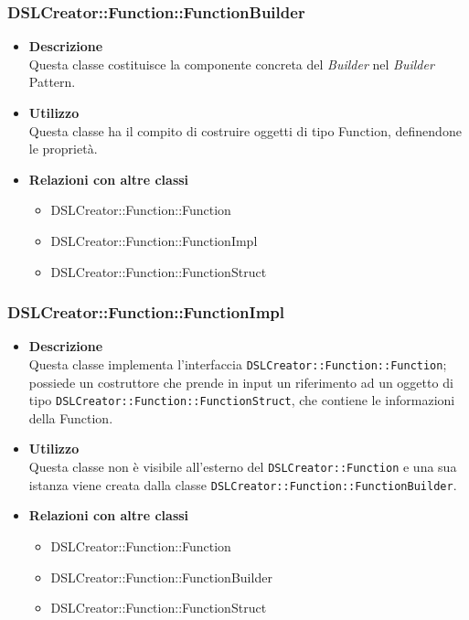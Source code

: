  \subsubsection{DSLCreator::Function::FunctionBuilder}
                    \begin{itemize}
                        \item \textbf{Descrizione} \hfill \\
                          Questa classe costituisce la componente concreta del \textit{Builder} nel \textit{Builder} Pattern.
                        \item \textbf{Utilizzo} \hfill \\
                          Questa classe ha il compito di costruire oggetti di tipo Function, definendone le proprietà.
                        \item \textbf{Relazioni con altre classi}
                            \begin{itemize}
                              \item DSLCreator::Function::Function
                              \item DSLCreator::Function::FunctionImpl
                              \item DSLCreator::Function::FunctionStruct
                            \end{itemize}
                    \end{itemize}  

 \subsubsection{DSLCreator::Function::FunctionImpl}
                    \begin{itemize}
                        \item \textbf{Descrizione} \hfill \\
                          Questa classe implementa l'interfaccia \texttt{DSLCreator::Function::Function}; possiede un costruttore che prende in input un riferimento ad un oggetto di tipo \texttt{DSLCreator::Function::FunctionStruct}, che contiene le informazioni della Function.
                        \item \textbf{Utilizzo} \hfill \\
                          Questa classe non è visibile all'esterno del  \texttt{DSLCreator::Function} e una sua istanza viene creata dalla classe \texttt{DSLCreator::Function::FunctionBuilder}.
                        \item \textbf{Relazioni con altre classi}
                            \begin{itemize}
                              \item DSLCreator::Function::Function
                              \item DSLCreator::Function::FunctionBuilder
                              \item DSLCreator::Function::FunctionStruct
                            \end{itemize}
                    \end{itemize}  

